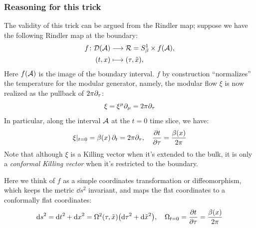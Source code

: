 \documentclass[11pt,a4paper]{article}
\begin{document}
\subsubsection*{Reasoning for this trick}
	The validity of this trick can be argued from the Rindler map; suppose we have the following Rindler map at the boundary:
	\begin{equation}
	\begin{aligned}
		f\colon
		\mathcal{D}(\mathcal{A})
		&\longrightarrow \mathcal{R} = S^1_\beta \times f(\mathcal{A}), \\
		(t,x)
		&\longmapsto (\tau,\tilde{x}),
	\end{aligned}
	\end{equation}
	Here $f(\mathcal{A})$ is the image of the boundary interval. $f$ by construction ``normalizes'' the temperature for the modular generator, namely, the modular flow $\xi$ is now realized as the pullback of $2\pi\partial_{\tau}$:
	\begin{equation}
		\xi = \xi^\mu \partial_{\mu}
		= 2\pi\partial_{\tau}
	\end{equation}
	In particular, along the interval $\mathcal{A}$ at the $t = 0$ time slice, we have:
	\begin{equation}
		\xi|_{t = 0}
		= \beta(x)\,\partial_{t}
		= 2\pi\partial_{\tau},
	\quad
		\pdv{t}{\tau}
		= \frac{\beta(x)}{2\pi}
	\end{equation}
	Note that although $\xi$ is a Killing vector when it's extended to the bulk, it is only a \textit{conformal Killing vector} when it's restricted to the boundary. 
	
	Here we think of $f$ as a simple coordinates transformation or diffeomorphism, which keeps the metric $\dd{s}^2$ invariant, and maps the flat coordinates to a conformally flat coordinates:
	\begin{equation}
		\dd{s}^2
		= \dd{t}^2 + \dd{x}^2
		= \Omega^2(\tau,\tilde{x}) \pqty{
				\dd{\tau}^2 + \dd{\tilde{x}}^2
			},
	\quad
		\Omega_{t = 0} = \pdv{t}{\tau}
		= \frac{\beta(x)}{2\pi}
	\end{equation}
	
\end{document}
